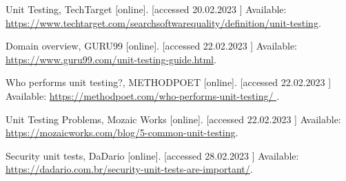 \begin{thebibliography}{99}
\singlespace \normalsize


 Unit Testing, TechTarget [online]. [accessed 20.02.2023 ] Available:
  \url{https://www.techtarget.com/searchsoftwarequality/definition/unit-testing}.

 Domain overview, GURU99 [online]. [accessed 22.02.2023 ] Available:  
  \url{https://www.guru99.com/unit-testing-guide.html}.

Who performs unit testing?, METHODPOET [online]. [accessed 22.02.2023 ] Available:  
  \url{https://methodpoet.com/who-performs-unit-testing/ }.

Unit Testing Problems, Mozaic Works [online]. [accessed 22.02.2023 ] Available:
  \url{https://mozaicworks.com/blog/5-common-unit-testing}.

Security unit tests, DaDario [online]. [accessed 28.02.2023 ] Available:
  \url{ https://dadario.com.br/security-unit-tests-are-important/}.

\end{thebibliography}

